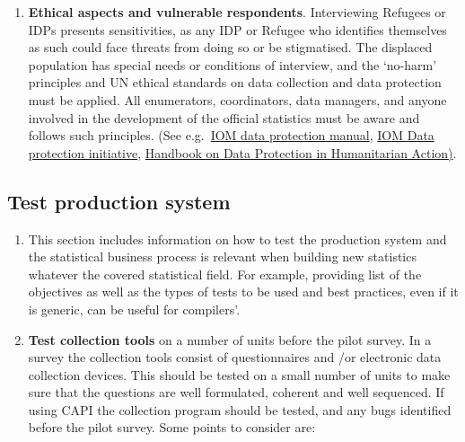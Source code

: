 \documentclass[
]{article}
\providecommand{\tightlist}{%
  \setlength{\itemsep}{0pt}\setlength{\parskip}{0pt}}
\begin{document}
\begin{enumerate}
\def\labelenumi{\arabic{enumi}.}
\setcounter{enumi}{310}
\tightlist
\item
  \textbf{Ethical aspects and vulnerable respondents}. Interviewing
  Refugees or IDPs presents sensitivities, as any IDP or Refugee who
  identifies themselves as such could face threats from doing so or be
  stigmatised. The displaced population has special needs or
  conditions of interview, and the `no-harm' principles and UN ethical
  standards on data collection and data protection must be applied.
  All enumerators, coordinators, data managers, and anyone involved in
  the development of the official statistics must be aware and follows
  such principles. (See e.g.~\href{https://publications.iom.int/books/iom-data-protection-manual}{IOM data protection
  manual},
  \href{https://www.iom.int/press-room}{IOM Data protection initiative},
  \href{https://www.icrc.org/en/publication/handbook-data-protection-humanitarian-action}{Handbook on Data Protection in Humanitarian
  Action)}.
\end{enumerate}

\hypertarget{test-production-system}{%
\subsection{Test production system}\label{test-production-system}}

\begin{enumerate}
\def\labelenumi{\arabic{enumi}.}
\setcounter{enumi}{311}
\item
  This section includes information on how to test the production
  system and the statistical business process is relevant when
  building new statistics whatever the covered statistical field. For
  example, providing list of the objectives as well as the types of
  tests to be used and best practices, even if it is generic, can be
  useful for compilers'.
\item
  \textbf{Test collection tools} on a number of units before the pilot
  survey. In a survey the collection tools consist of questionnaires
  and /or electronic data collection devices. This should be tested on
  a small number of units to make sure that the questions are well
  formulated, coherent and well sequenced. If using CAPI the
  collection program should be tested, and any bugs identified before
  the pilot survey. Some points to consider are:
\end{enumerate}
\end{document}
